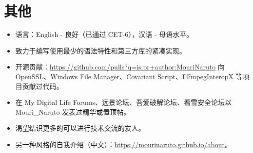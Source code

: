 \documentclass{resume}
\begin{document}
\section{其他}
\begin{itemize}

  \item 语言：English - 良好（已通过 CET-6），汉语 - 母语水平。

  \item 致力于编写使用最少的语法特性和第三方库的紧凑实现。

  \item 开源贡献：\href{https://github.com/pulls?q=is:pr+author:MouriNaruto}{https://github.com/pulls?q=is:pr+author:MouriNaruto} 向 OpenSSL、Windows File Manager、Covariant Script、FFmpegInteropX 等项目贡献过代码。
  
  \item 在 My Digital Life Forums、远景论坛、吾爱破解论坛、看雪安全论坛以 Mouri\_Naruto 发表过精华或置顶帖。
  
  \item 渴望结识更多的可以进行技术交流的友人。

  \item 另一种风格的自我介绍（中文）：\href{https://mourinaruto.github.io/about}{https://mourinaruto.github.io/about}。
  
\end{itemize}
\end{document}
